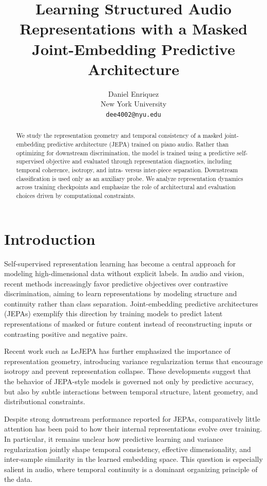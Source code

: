 \documentclass[10pt,twocolumn]{article}
\title{Learning Structured Audio Representations with a Masked Joint-Embedding Predictive Architecture}
\author{
  Daniel Enriquez \\
  New York University \\
  \texttt{dee4002@nyu.edu}
}
\date{}
\begin{document}
\maketitle

\begin{abstract}
We study the representation geometry and temporal consistency of a masked joint-embedding predictive architecture (JEPA) trained on piano audio. Rather than optimizing for downstream discrimination, the model is trained using a predictive self-supervised objective and evaluated through representation diagnostics, including temporal coherence, isotropy, and intra- versus inter-piece separation. Downstream classification is used only as an auxiliary probe. We analyze representation dynamics across training checkpoints and emphasize the role of architectural and evaluation choices driven by computational constraints.
\end{abstract}

\section{Introduction}

Self-supervised representation learning has become a central approach for modeling high-dimensional data without explicit labels. In audio and vision, recent methods increasingly favor predictive objectives over contrastive discrimination, aiming to learn representations by modeling structure and continuity rather than class separation. Joint-embedding predictive architectures (JEPAs) exemplify this direction by training models to predict latent representations of masked or future content instead of reconstructing inputs or contrasting positive and negative pairs.

Recent work such as LeJEPA has further emphasized the importance of representation geometry, introducing variance regularization terms that encourage isotropy and prevent representation collapse. These developments suggest that the behavior of JEPA-style models is governed not only by predictive accuracy, but also by subtle interactions between temporal structure, latent geometry, and distributional constraints.

Despite strong downstream performance reported for JEPAs, comparatively little attention has been paid to how their internal representations evolve over training. In particular, it remains unclear how predictive learning and variance regularization jointly shape temporal consistency, effective dimensionality, and inter-sample similarity in the learned embedding space. This question is especially salient in audio, where temporal continuity is a dominant organizing principle of the data.
\end{document}
